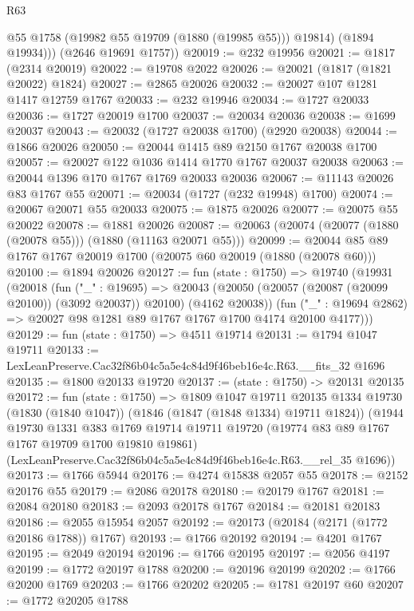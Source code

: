 \begin{lexlean}{R63}
\begin{coremodule}
            @55
            @1758
            (@19982 @55 @19709 (@1880 (@19985 @55)))
            @19814)
          (@1894 @19934)))
      (@2646 @19691 @1757))
@20019 := @232 @19956
@20021 := @1817 (@2314 @20019)
@20022 := @19708 @2022
@20026 := @20021 (@1817 (@1821 @20022) @1824)
@20027 := @2865 @20026
@20032 := @20027 @107 @1281 @1417 @12759 @1767
@20033 := @232 @19946
@20034 := @1727 @20033
@20036 := @1727 @20019 @1700
@20037 := @20034 @20036
@20038 := @1699 @20037
@20043 := @20032 (@1727 @20038 @1700) (@2920 @20038)
@20044 := @1866 @20026
@20050 := @20044 @1415 @89 @2150 @1767 @20038 @1700
@20057 := @20027 @122 @1036 @1414 @1770 @1767 @20037 @20038
@20063 := @20044 @1396 @170 @1767 @1769 @20033 @20036
@20067 := @11143 @20026 @83 @1767 @55
@20071 := @20034 (@1727 (@232 @19948) @1700)
@20074 := @20067 @20071 @55 @20033
@20075 := @1875 @20026
@20077 := @20075 @55 @20022
@20078 := @1881 @20026
@20087 := @20063 (@20074 (@20077 (@1880 (@20078 @55))) (@1880 (@11163 @20071 @55)))
@20099 := @20044 @85 @89 @1767 @1767 @20019 @1700 (@20075 @60 @20019 (@1880 (@20078 @60)))
@20100 := @1894 @20026
@20127 := fun (state : @1750) =>
  @19740
    (@19931
      (@20018
        (fun ("_" : @19695) =>
        @20043 (@20050 (@20057 (@20087 (@20099 @20100)) (@3092 @20037)) @20100) (@4162 @20038))
        (fun ("_" : @19694 @2862) => @20027 @98 @1281 @89 @1767 @1767 @1700 @4174 @20100 @4177)))
@20129 := fun (state : @1750) => @4511 @19714
@20131 := @1794 @1047 @19711
@20133 := LexLeanPreserve.Cac32f86b04c5a5e4c84d9f46beb16e4c.R63.__fits_32 @1696
@20135 := @1800 @20133 @19720
@20137 := (state : @1750) -> @20131 @20135
@20172 := fun (state : @1750) =>
  @1809
    @1047
    @19711
    @20135
    @1334
    @19730
    (@1830 (@1840 @1047))
    (@1846 (@1847 (@1848 @1334) @19711 @1824))
    (@1944
      @19730
      @1331
      @383
      @1769
      @19714
      @19711
      @19720
      (@19774 @83 @89 @1767 @1767 @19709 @1700 @19810 @19861)
      (LexLeanPreserve.Cac32f86b04c5a5e4c84d9f46beb16e4c.R63.__rel_35 @1696))
@20173 := @1766 @5944
@20176 := @4274 @15838 @2057 @55
@20178 := @2152 @20176 @55
@20179 := @2086 @20178
@20180 := @20179 @1767
@20181 := @2084 @20180
@20183 := @2093 @20178 @1767
@20184 := @20181 @20183
@20186 := @2055 @15954 @2057
@20192 := @20173 (@20184 (@2171 (@1772 @20186 @1788)) @1767)
@20193 := @1766 @20192
@20194 := @4201 @1767
@20195 := @2049 @20194
@20196 := @1766 @20195
@20197 := @2056 @4197
@20199 := @1772 @20197 @1788
@20200 := @20196 @20199
@20202 := @1766 @20200 @1769
@20203 := @1766 @20202
@20205 := @1781 @20197 @60
@20207 := @1772 @20205 @1788

\end{coremodule}
\end{lexlean}
